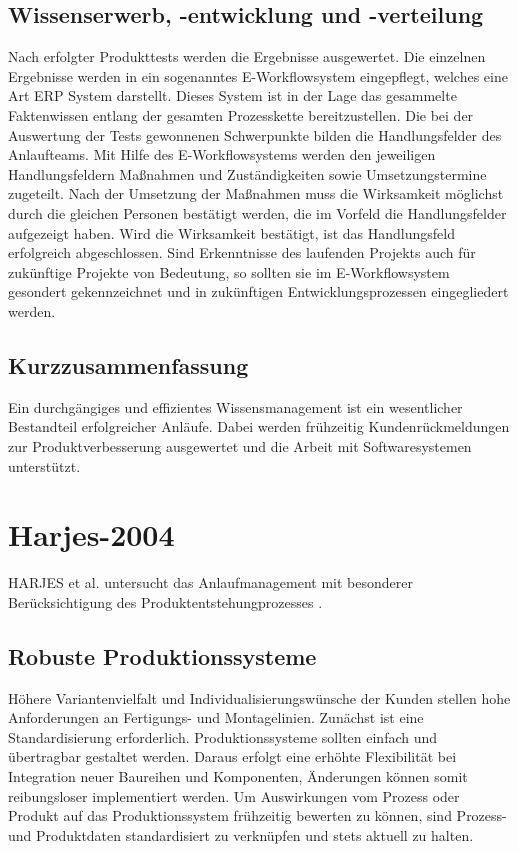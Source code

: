 \subsection{Wissenserwerb, -entwicklung und -verteilung}
Nach erfolgter Produkttests werden die Ergebnisse ausgewertet. Die einzelnen Ergebnisse werden in ein sogenanntes E-Workflowsystem eingepflegt, welches eine Art ERP System darstellt. %
Dieses System ist in der Lage das gesammelte Faktenwissen entlang der gesamten Prozesskette bereitzustellen. Die bei der Auswertung der Tests gewonnenen Schwerpunkte bilden die Handlungsfelder des Anlaufteams. Mit Hilfe des E-Workflowsystems werden den jeweiligen Handlungsfeldern Maßnahmen und Zuständigkeiten sowie Umsetzungstermine zugeteilt. 
Nach der Umsetzung der Maßnahmen muss die Wirksamkeit möglichst durch die gleichen Personen bestätigt werden, die im Vorfeld die Handlungsfelder aufgezeigt haben. Wird die Wirksamkeit bestätigt, ist das Handlungsfeld erfolgreich abgeschlossen. 
Sind Erkenntnisse des laufenden Projekts auch für zukünftige Projekte von Bedeutung, so sollten sie im E-Workflowsystem gesondert gekennzeichnet und in zukünftigen Entwicklungsprozessen eingegliedert werden. 


\subsection{Kurzzusammenfassung}

Ein durchgängiges und effizientes Wissensmanagement ist ein wesentlicher Bestandteil erfolgreicher Anläufe. Dabei werden frühzeitig Kundenrückmeldungen zur Produktverbesserung ausgewertet und die Arbeit mit Softwaresystemen unterstützt. 

\section{Harjes-2004}

HARJES et al. untersucht das Anlaufmanagement mit besonderer Berücksichtigung des Produktentstehungprozesses \cite{Harjes2004}. 

\subsection{Robuste Produktionssysteme}

Höhere Variantenvielfalt und Individualisierungswünsche der Kunden stellen hohe Anforderungen an Fertigungs- und Montagelinien. Zunächst ist eine Standardisierung erforderlich. Produktionssysteme sollten einfach und übertragbar gestaltet werden. Daraus erfolgt eine erhöhte Flexibilität bei Integration neuer Baureihen und Komponenten, Änderungen können somit reibungsloser implementiert werden. Um Auswirkungen vom Prozess oder Produkt auf das Produktionssystem frühzeitig bewerten zu können, sind Prozess- und Produktdaten standardisiert zu verknüpfen und stets aktuell zu halten. 


